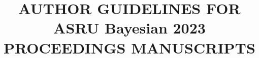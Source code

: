 \documentclass{article}
\begin{document}
\title{AUTHOR GUIDELINES FOR ASRU Bayesian 2023 PROCEEDINGS MANUSCRIPTS}
%
\address{Author Affiliation(s)}
%
%
%
\end{document}
